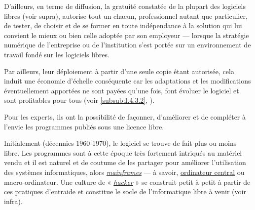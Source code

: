 D'ailleurs, en terme de diffusion, la gratuité constatée 
de la plupart des logiciels libres (voir supra), autorise tout un chacun, professionnel autant que particulier, de tester, de choisir et de se former en toute indépendance à la solution qui lui convient le mieux ou bien celle adoptée par son employeur --- lorsque la stratégie numérique de l'entreprise ou de l'institution s'est portée sur un environnement de travail fondé sur les logiciels libres.

Par ailleurs, leur déploiement à partir d'une seule copie étant autorisée, cela induit une économie d'échelle conséquente car les adaptations et les modifications éventuellement apportées ne sont payées qu'une fois, font évoluer le logiciel et sont profitables pour tous (voir \cref{subsub:I.4.3.2}, ).

Pour les experts, ils ont la possibilité de façonner, d'améliorer et de compléter à l'envie les programmes publiés sous une licence libre.


Initialement (décennies 1960-1970), le logiciel se trouve de fait plus ou moins libre. Les programmes sont à cette époque très fortement intriqués au matériel vendu et il est naturel et de coutume de les partager pour améliorer l'utilisation des systèmes informatiques, alors \href{https://en.wikipedia.org/wiki/Mainframe_computer}{\textit{mainframes}} --- à savoir, \href{https://fr.wikipedia.org/wiki/Ordinateur_central}{ordinateur central} ou macro-ordinateur. Une culture de « \href{https://fr.wikipedia.org/wiki/Hacker_(sous-culture)}{\textit{hacker}} » se construit petit à petit à partir de ces pratiques d'entraide et constitue le socle de l'informatique libre à venir (voir infra).

